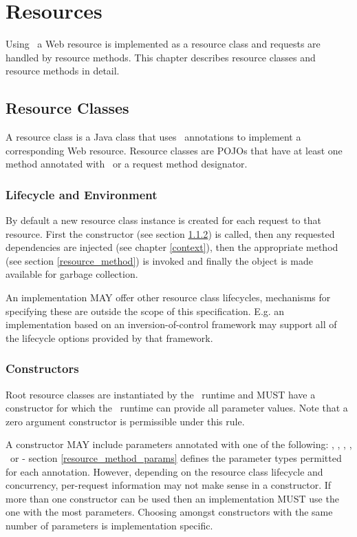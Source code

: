 \chapter{Resources}
\label{resources}

Using \jaxrs\, a Web resource is implemented as a resource class and requests are handled by resource methods. This chapter describes resource classes and resource methods in detail.

\section{Resource Classes}

A resource class is a Java class that uses \jaxrs\ annotations to implement a corresponding Web resource. Resource classes are POJOs that have at least one method annotated with \Path\ or a request method designator.

\subsection{Lifecycle and Environment}

By default a new resource class instance is created for each request to that resource. First the constructor (see section \ref{resource_class_constructor}) is called, then any requested dependencies are injected (see chapter \ref{context}), then the appropriate method (see section \ref{resource_method}) is invoked and finally the object is made available for garbage collection.

An implementation MAY offer other resource class lifecycles, mechanisms for specifying these are outside the scope of this specification. E.g. an implementation based on an inversion-of-control framework may support all of the lifecycle options provided by that framework.

\subsection{Constructors}
\label{resource_class_constructor}

Root resource classes are instantiated by the \jaxrs\ runtime and MUST have a constructor for which the \jaxrs\ runtime can provide all parameter values. Note that a zero argument constructor is permissible under this rule.

A constructor MAY include parameters annotated with one of the following: \Context, \HeaderParam, \CookieParam, \MatrixParam, \QueryParam\ or \PathParam - section \ref{resource_method_params} defines the parameter types permitted for each annotation. However, depending on the resource class lifecycle and concurrency, per-request information may not make sense in a constructor. If more than one constructor can be used then an implementation MUST use the one with the most parameters. Choosing amongst constructors with the same number of parameters is implementation specific.

